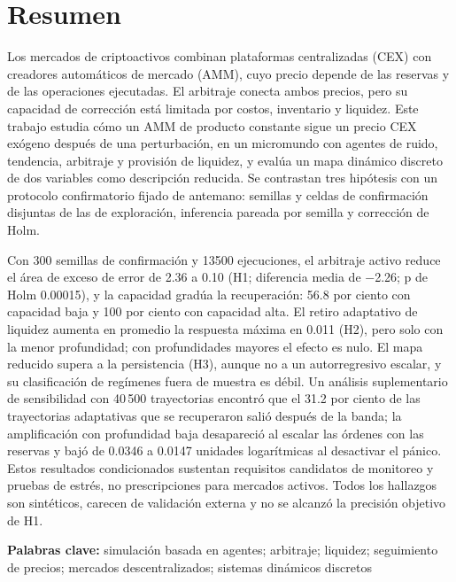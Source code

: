 \section{Resumen}

Los mercados de criptoactivos combinan plataformas centralizadas (CEX) con creadores automáticos de mercado (AMM), cuyo precio depende de las reservas y de las operaciones ejecutadas. El arbitraje conecta ambos precios, pero su capacidad de corrección está limitada por costos, inventario y liquidez. Este trabajo estudia cómo un AMM de producto constante sigue un precio CEX exógeno después de una perturbación, en un micromundo con agentes de ruido, tendencia, arbitraje y provisión de liquidez, y evalúa un mapa dinámico discreto de dos variables como descripción reducida. Se contrastan tres hipótesis con un protocolo confirmatorio fijado de antemano: semillas y celdas de confirmación disjuntas de las de exploración, inferencia pareada por semilla y corrección de Holm.

Con 300 semillas de confirmación y 13500 ejecuciones, el arbitraje activo reduce el área de exceso de error de 2.36 a 0.10 (H1; diferencia media de −2.26; p de Holm 0.00015), y la capacidad gradúa la recuperación: 56.8 por ciento con capacidad baja y 100 por ciento con capacidad alta. El retiro adaptativo de liquidez aumenta en promedio la respuesta máxima en 0.011 (H2), pero solo con la menor profundidad; con profundidades mayores el efecto es nulo. El mapa reducido supera a la persistencia (H3), aunque no a un autorregresivo escalar, y su clasificación de regímenes fuera de muestra es débil. Un análisis suplementario de sensibilidad con 40\,500 trayectorias encontró que el 31.2 por ciento de las trayectorias adaptativas que se recuperaron salió después de la banda; la amplificación con profundidad baja desapareció al escalar las órdenes con las reservas y bajó de 0.0346 a 0.0147 unidades logarítmicas al desactivar el pánico. Estos resultados condicionados sustentan requisitos candidatos de monitoreo y pruebas de estrés, no prescripciones para mercados activos. Todos los hallazgos son sintéticos, carecen de validación externa y no se alcanzó la precisión objetivo de H1.

\textbf{Palabras clave:} simulación basada en agentes; arbitraje; liquidez; seguimiento de precios; mercados descentralizados; sistemas dinámicos discretos
